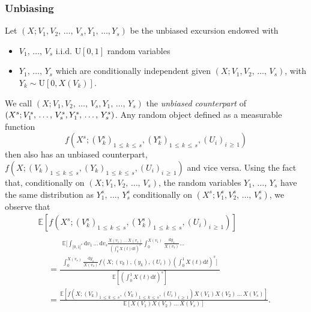 \documentclass[10pt]{amsart}
\theoremstyle{definition}\newtheorem{defi}[theo]{Definition}\newtheorem{rema}[theo]{Remark}\newtheorem{exam}[theo]{Example}\newtheorem{exem}[theo]{Example}\newtheorem{nota}[theo]{Notation}
\newcommand{\intervalle}[4]{\mathopen{#1}#2
\mathclose{}\mathpunct{},#3
\mathclose{#4}}
\newcommand{\intervalleff}[2]{\intervalle{[}{#1}{#2}{]}}
\newcommand{\E}[1]{\ensuremath{\mathbb{E} \left[#1 \right]}}
\newcommand{\rmd}{\mathrm{d}}
\newcommand{\rmU}{\mathrm{U}}
\newcommand{\bbE}{\mathbb{E}}
\begin{document}
\subsubsection{Unbiasing}
Let $(X;V_1,V_2,\,\dots,\,V_s,Y_1,\,\dots,Y_s)$ be the unbiased excursion endowed with
\begin{itemize}
\item $V_1,\,\dots,\,V_s$ i.i.d. $\rmU[0,1]$ random variables
\item $Y_1,\,\dots,\,Y_s$ which are conditionally independent given $(X;V_1,V_2,\,\dots,\,V_s)$, with $Y_k \sim \rmU[0,X(V_k)]$.
\end{itemize}
We call $(X;V_1,V_2,\,\dots,\,V_s,Y_1,\,\dots,\,Y_s)$ the \emph{unbiased counterpart} of $(X^s;V^s_1,\,\dots,\,V^s_s,\linebreak Y^s_1,\,\dots,\,Y^s_s)$. Any random object defined as a measurable function 
\[
f\left(X^s;(V^s_k)_{1\,\leq\,k\,\leq\,s},\left(Y^s_k\right)_{1\,\leq\,k\,\leq\,s},(U_i)_{i\,\geq\,1}\right)
\]
then also has an unbiased counterpart, $f(X;(V_k)_{1\,\leq\,k\,\leq\,s},(Y_k)_{1\,\leq\,k\,\leq\, s},(U_i)_{i\,\geq\,1})$ and vice versa. Using the fact that, conditionally on $(X;V_1,V_2,\,\dots,\,V_s)$, the random variables $Y_1,\,\dots,\,Y_s$ have the same distribution as $Y^s_1,\,\dots,\,Y^s_s$ conditionally on $(X^s;V^s_1,V^s_2,\,\dots,\,V^s_s)$, we observe that
\begin{multline}\label{eq:change of measure}
\E{f\left(X^s;\left(V^s_k\right)_{1\,\leq\,k\,\leq \,s},\left(Y^s_k\right)_{1\,\leq\,k\,\leq\,s},\left(U_i\right)_{i\,\geq\,1}\right)}  \\
\begin{aligned}
&=\frac{
\begin{aligned}
\bbE\Bigg[\int_{\intervalleff{0}{1}^s}\rmd v_1\,\ldots\,\rmd v_s \frac{X\left(v_1\right)\,\ldots\,X\left(v_s\right)}{\left(\int_0^1 X(t) \rmd t \right)^s} \int_{0}^{X(v_1)}\frac{\rmd y_1}{X(v_1)}\ldots\\
\int_{0}^{X\left(v_s\right)}\frac{\rmd y_s}{X\left(v_s\right)} f\left(X; \left(v_k\right),\left(y_k\right),\left(U_i\right)\right) \left(\int_0^1 X(t) \rmd t \right)^s\Bigg]
\end{aligned}}{ \E{\left(\int_0^1 X(t) \rmd t \right)^s} }\\
&= \frac{\E{f\left(X; \left(V_k\right)_{1\,\leq\,k\, \leq\,s}, \left(Y_k\right)_{1\,\leq\,k\,\leq\,s},\left(U_i\right)_{i\,\geq\,1}\right) X\left(V_1\right)X\left(V_2\right)\,\ldots\,X\left(V_s\right)}}{ \E{X\left(V_1\right) X\left(V_2\right)\,\ldots\,X\left(V_s\right)}}.
\end{aligned}
\end{multline}
\end{document}
